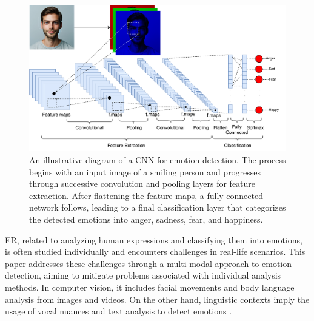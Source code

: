 \documentclass[runningheads]{llncs}
\begin{document}
\begin{figure}[htb]
\centering
\includegraphics[width=0.97\linewidth]{CNNArchitecture.pdf}
\caption{An illustrative diagram of a CNN for emotion detection. The process begins with an input image of a smiling person and progresses through successive convolution and pooling layers for feature extraction. After flattening the feature maps, a fully connected network follows, leading to a final classification layer that categorizes the detected emotions into anger, sadness, fear, and happiness.}
\label{fig:cnnarchitecture}
\end{figure}

ER, related to analyzing human expressions and classifying them into emotions, is often studied individually and encounters challenges in real-life scenarios. This paper addresses these challenges through a multi-modal approach to emotion detection, aiming to mitigate problems associated with individual analysis methods. In computer vision, it includes facial movements and body language analysis from images and videos. On the other hand, linguistic contexts imply the usage of vocal nuances and text analysis to detect emotions \cite{Chul2018, Trigeorgis2016, Karna2020}. 
\end{document}
